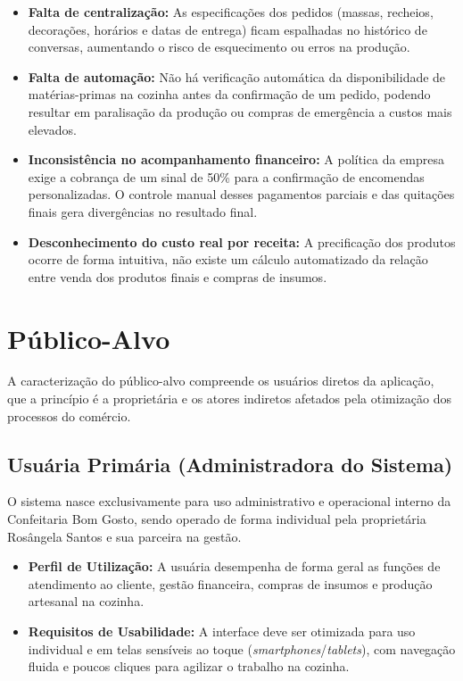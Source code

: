 \begin{itemize}
    \item \textbf{Falta de centralização:} As especificações dos pedidos (massas, recheios, decorações, horários e datas de entrega) ficam espalhadas no histórico de conversas, aumentando o risco de esquecimento ou erros na produção.
    \item \textbf{Falta de automação:} Não há verificação automática da disponibilidade de matérias-primas na cozinha antes da confirmação de um pedido, podendo resultar em paralisação da produção ou compras de emergência a custos mais elevados.
    \item \textbf{Inconsistência no acompanhamento financeiro:} A política da empresa exige a cobrança de um sinal de 50\% para a confirmação de encomendas personalizadas. O controle manual desses pagamentos parciais e das quitações finais gera divergências no resultado final.
    \item \textbf{Desconhecimento do custo real por receita:} A precificação dos produtos ocorre de forma intuitiva, não existe um cálculo automatizado da relação entre venda dos produtos finais e compras de insumos.
\end{itemize}

\section{Público-Alvo}
A caracterização do público-alvo compreende os usuários diretos da aplicação, que a princípio é a proprietária e os atores indiretos afetados pela otimização dos processos do comércio.

\subsection{Usuária Primária (Administradora do Sistema)}

O sistema nasce exclusivamente para uso administrativo e operacional interno da Confeitaria Bom Gosto, sendo operado de forma individual pela proprietária Rosângela Santos e sua parceira na gestão.
\begin{itemize}
    \item \textbf{Perfil de Utilização:} A usuária desempenha de forma geral as funções de atendimento ao cliente, gestão financeira, compras de insumos e produção artesanal na cozinha.
    \item \textbf{Requisitos de Usabilidade:} A interface deve ser otimizada para uso individual e em telas sensíveis ao toque (\textit{smartphones}/\textit{tablets}), com navegação fluida e poucos cliques para agilizar o trabalho na cozinha.
\end{itemize}

